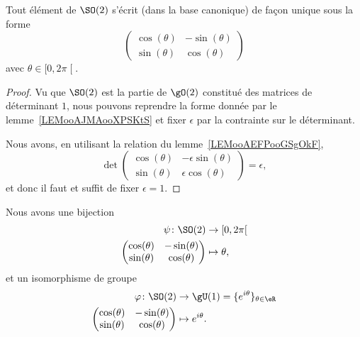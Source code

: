 \begin{lemma}       \label{LEMooHRESooQTrpMz}
    Tout élément de \( \SO(2)\) s'écrit (dans la base canonique) de façon unique sous la forme
    \begin{equation}
        \begin{pmatrix}
            \cos(\theta)    &   -\sin(\theta)    \\
            \sin(\theta)    &   \cos(\theta)
        \end{pmatrix}
    \end{equation}
    avec \( \theta\in\mathopen[ 0 , 2\pi \mathclose[\).
\end{lemma}

\begin{proof}
    Vu que \( \SO(2)\) est la partie de \( \gO(2)\) constitué des matrices de déterminant \( 1\), nous pouvons reprendre la forme donnée par le lemme~\ref{LEMooAJMAooXPSKtS} et fixer \( \epsilon\) par la contrainte sur le déterminant.

    Nous avons, en utilisant la relation du lemme~\ref{LEMooAEFPooGSgOkF},
    \begin{equation}
        \det\begin{pmatrix}
            \cos(\theta)    &   -\epsilon\sin(\theta)    \\
            \sin(\theta)    &   \epsilon\cos(\theta)
        \end{pmatrix}=\epsilon,
    \end{equation}
    et donc il faut et suffit de fixer \( \epsilon=1\).
\end{proof}

\begin{corollary}        \label{CORooGGVUooLQYGET}
    Nous avons une bijection
    \begin{equation}
        \begin{aligned}
            \psi\colon \SO(2)&\to \mathopen[ 0 , 2\pi \mathclose[ \\
        \begin{pmatrix}
            \cos(\theta)    &   -\sin(\theta)    \\
            \sin(\theta)    &   \cos(\theta)
        \end{pmatrix}
              &\mapsto \theta,
        \end{aligned}
    \end{equation}
    et un isomorphisme de groupe
    \begin{equation}
        \begin{aligned}
            \varphi\colon \SO(2)&\to \gU(1)=\{  e^{i\theta} \}_{\theta\in \eR} \\
        \begin{pmatrix}
            \cos(\theta)    &   -\sin(\theta)    \\
            \sin(\theta)    &   \cos(\theta)
        \end{pmatrix}
        &\mapsto  e^{i\theta}.
        \end{aligned}
    \end{equation}
\end{corollary}


